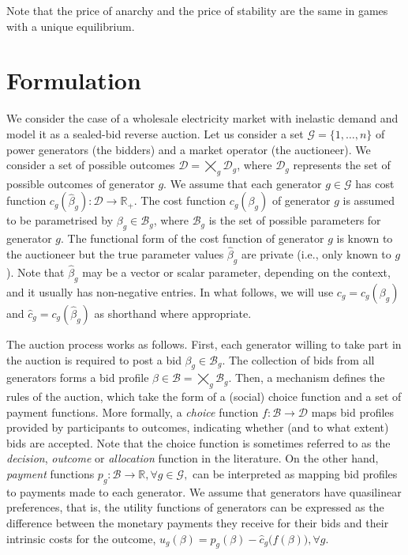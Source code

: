 \documentclass{article}
\begin{document}
Note that the price of anarchy and the price of stability are the same in games with a unique equilibrium.

\section{Formulation}

We consider the case of a wholesale electricity market with inelastic demand and model it as a sealed-bid reverse auction. Let us consider a set $\mathcal{G} = \{1, \ldots, n\}$ of power generators (the bidders) and a market operator (the auctioneer). We consider a set of possible outcomes $\mathcal{D} = \bigtimes_g \mathcal{D}_g$, where $\mathcal{D}_g$ represents the set of possible outcomes of generator $g$. We assume that each generator $g \in \mathcal{G}$ has cost function $c_g(\hat{\beta}_g): \mathcal{D} \rightarrow \mathbb{R}_+$. The cost function $c_g(\beta_g)$ of generator $g$ is assumed to be parametrised by $\beta_g \in \mathcal{B}_g$, where $\mathcal{B}_g$ is the set of possible parameters for generator $g$. The functional form of the cost function of generator $g$ is known to the auctioneer but the true parameter values $\hat{\beta}_g$ are private (i.e., only known to $g$). Note that $\hat{\beta}_g$ may be a vector or scalar parameter, depending on the context, and it usually has non-negative entries. In what follows, we will use $c_g = c_g(\beta_g)$ and $\hat{c}_g = c_g(\hat{\beta}_g)$ as shorthand where appropriate.

The auction process works as follows. First, each generator willing to take part in the auction is required to post a bid $\beta_g \in \mathcal{B}_g$. The collection of bids from all generators forms a bid profile $\beta \in \mathcal{B} = \bigtimes_g \mathcal{B}_g$. Then, a mechanism defines the rules of the auction, which take the form of a (social) choice function and a set of payment functions. More formally, a \textit{choice} function $f: \mathcal{B} \rightarrow \mathcal{D}$ maps bid profiles provided by participants to outcomes, indicating whether (and to what extent) bids are accepted. Note that the choice function is sometimes referred to as the \textit{decision}, \textit{outcome} or \textit{allocation} function in the literature. On the other hand, \textit{payment} functions $p_g: \mathcal{B} \rightarrow \mathbb{R}, \forall g \in \mathcal{G},$  can be interpreted as mapping bid profiles to payments made to each generator. We assume that generators have quasilinear preferences, that is, the utility functions of generators can be expressed as the difference between the monetary payments they receive for their bids and their intrinsic costs for the outcome, $u_g(\beta) = p_g(\beta) - \hat{c}_g\big(f(\beta)\big), \forall g$.
\end{document}
